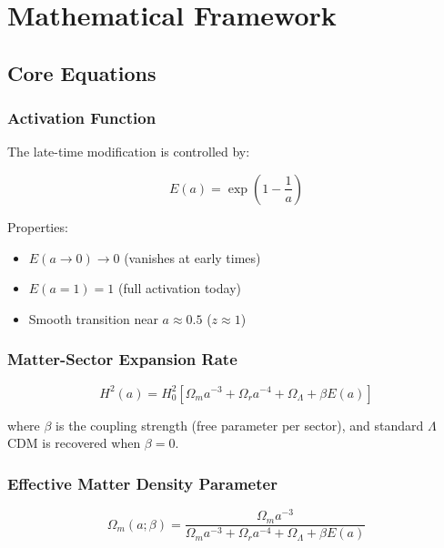 \documentclass[11pt,letterpaper]{article}
\begin{document}
\section{Mathematical Framework}

\subsection{Core Equations}

\subsubsection{Activation Function}

The late-time modification is controlled by:

\begin{equation}
E(a) = \exp\left(1 - \frac{1}{a}\right)
\end{equation}

\noindent Properties:
\begin{itemize}
\item $E(a \to 0) \to 0$ (vanishes at early times)
\item $E(a = 1) = 1$ (full activation today)
\item Smooth transition near $a \approx 0.5$ ($z \approx 1$)
\end{itemize}

\subsubsection{Matter-Sector Expansion Rate}

\begin{equation}
H^2(a) = H_0^2\left[\Omega_m a^{-3} + \Omega_r a^{-4} + \Omega_\Lambda + \beta E(a)\right]
\end{equation}

where $\beta$ is the coupling strength (free parameter per sector), and standard $\Lambda$CDM is recovered when $\beta = 0$.

\subsubsection{Effective Matter Density Parameter}

\begin{equation}
\Omega_m(a; \beta) = \frac{\Omega_m a^{-3}}{\Omega_m a^{-3} + \Omega_r a^{-4} + \Omega_\Lambda + \beta E(a)}
\end{equation}
\end{document}
